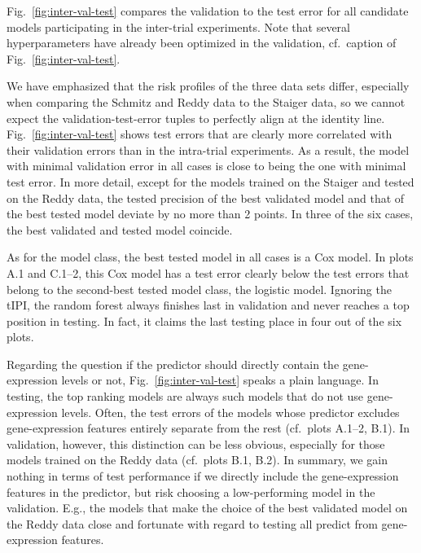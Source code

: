 

Fig.\ \ref{fig:inter-val-test} compares the validation to the test error for all candidate models 
participating in the inter-trial experiments. Note that several hyperparameters have already 
been optimized in the validation, cf.\ caption of Fig.\ \ref{fig:inter-val-test}. 

We have emphasized that the risk profiles of the three data sets differ, especially when comparing 
the Schmitz and Reddy data to the Staiger data, so we cannot expect the validation-test-error tuples 
to perfectly align at the identity line. Fig.\ 
\ref{fig:inter-val-test} shows test errors that are clearly more correlated with their validation 
errors than in the intra-trial experiments. As a result, the model with minimal validation error in all 
cases is close to being the one with minimal test error. In more detail, except for
the models trained on the Staiger and tested on the Reddy data, the tested precision of the best 
validated model and that of the best tested model deviate by no more than \num{2} points. In 
three of the six cases, the best validated and tested model coincide. 

As for the model class, the best tested model in all cases is a Cox model. In plots A.1 and C.1--2, 
this Cox model has a test error clearly below the test errors that belong to the second-best tested 
model class, the logistic model. Ignoring the tIPI, the random 
forest always finishes last in validation and never reaches a top position in testing. In fact, 
it claims the last testing place in four out of the six plots.

Regarding the question if the predictor should directly contain the gene-expression levels or not,
Fig.\ \ref{fig:inter-val-test} speaks a plain language. In testing, the top ranking models are 
always such models that do not use gene-expression levels. Often, the test errors of the models whose 
predictor excludes gene-expression features entirely separate from the rest (cf.\ plots A.1--2, B.1). 
In validation, however, this distinction can be less obvious, especially for those models trained on 
the Reddy data (cf.\ plots B.1, B.2). In summary, we gain nothing in terms of test 
performance if we directly include the gene-expression features in the predictor, but risk choosing 
a low-performing model in the validation. E.g., the models that 
make the choice of the best validated model on the Reddy data 
close and fortunate with regard to testing all predict from gene-expression features. 

